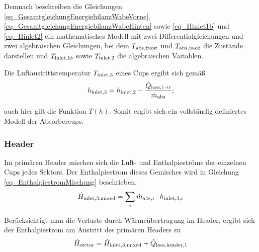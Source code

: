 Demnach beschreiben die Gleichungen \ref{eq_GesamtgleichungEnergiebilanzWabeVorne}, \ref{eq_GesamtgleichungEnergiebilanzWabeHinten} sowie \ref{eq_Hinlet1b} und \ref{eq_Hinlet2} ein mathematisches Modell mit zwei Differentialgleichungen und zwei algebraischen Gleichungen, bei dem $T_{\mathrm{abs,front}}$ und $T_{\mathrm{abs,back}}$ die Zustände darstellen und $T_{\mathrm{inlet,}1b}$ sowie $T_{\mathrm{inlet,}2}$ die algebraischen Variablen.

Die Luftaustrittstemperatur $T_{\mathrm{inlet,}3}$ eines Cups ergibt sich gemäß
\begin{equation} \label{eq_Hinlet3}
h_{\mathrm{inlet,}3} = h_{\mathrm{inlet,}2} - \frac{\dot{Q}_{\mathrm{loss,i \to r}}}{\dot{m}_{\mathrm{abs}}};
\end{equation}

\vspace*{-\baselineskip}auch hier gilt die Funktion $T(h)$. Somit ergibt sich ein vollständig definiertes Modell der Absorbercups.


\subsubsection*{Header} \label{subsubsec_Header}
Im primären Header mischen sich die Luft- und Enthalpieströme der einzelnen Cups jedes Sektors.
Der Enthalpiestrom dieses Gemisches wird in Gleichung \ref{eq_EnthalpiestromMischung} beschrieben.
\begin{equation} \label{eq_EnthalpiestromMischung}
    \dot{H}_{\mathrm{inlet,}3,\mathrm{mixed}} = \sum_i \dot{m}_{\mathrm{abs}, i} \cdot h_{\mathrm{inlet,}3,i}
\end{equation}

Berücksichtigt man die Verluste durch Wärmeübertragung im Header, ergibt sich der Enthalpiestrom am Austritt des primären Headers zu
\begin{equation} \label{eq_AustrittHeader1}
\dot{H}_{\mathrm{sector}} = \dot{H}_{\mathrm{inlet,}3,\mathrm{mixed}} + \dot{Q}_{\mathrm{loss,header,1}}
\end{equation}

